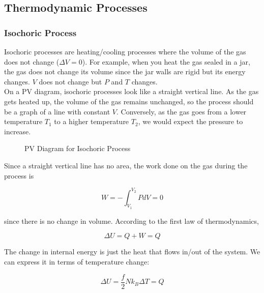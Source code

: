 \documentclass[12pt, a4paper]{article}
\newcounter{exa}
\begin{document}
\subsection{Thermodynamic Processes}

\subsubsection{Isochoric Process}

Isochoric processes are heating/cooling processes where the volume of the gas does not change ($\Delta V = 0$). For example, when you heat the gas sealed in a jar, the gas does not change its volume since the jar walls are rigid but its energy changes. $V$ does not change but $P$ and $T$ changes. \\

On a PV diagram, isochoric processes look like a straight vertical line. As the gas gets heated up, the volume of the gas remains unchanged, so the process should be a graph of a line with constant $V$. Conversely, as the gas goes from a lower temperature $T_1$ to a higher temperature $T_2$, we would expect the pressure to increase.

\begin{figure}[H]
\centering
{}
\caption{PV Diagram for Isochoric Process}
\end{figure}

Since a straight vertical line has no area, the work done on the gas during the process is

$$W=-\int_{V_1}^{V_2}PdV=0$$

since there is no change in volume. According to the first law of thermodynamics,

$$\Delta U=Q+W=Q$$

The change in internal energy is just the heat that flows in/out of the system. We can express it in terms of temperature change:

$$\Delta U=\frac{f}{2}Nk_B\Delta T=Q$$
\end{document}
